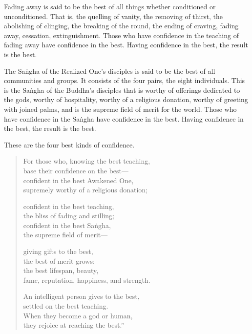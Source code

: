 \documentclass[12pt,openany]{book}%
\begin{document}
Fading away is said to be the best of all things whether conditioned or unconditioned. That is, the quelling of vanity, the removing of thirst, the abolishing of clinging, the breaking of the round, the ending of craving, fading away, cessation, extinguishment. Those who have confidence in the teaching of fading away have confidence in the best. Having confidence in the best, the result is the best. 

The \textsanskrit{Saṅgha} of the Realized One’s disciples is said to be the best of all communities and groups. It consists of the four pairs, the eight individuals. This is the \textsanskrit{Saṅgha} of the Buddha’s disciples that is worthy of offerings dedicated to the gods, worthy of hospitality, worthy of a religious donation, worthy of greeting with joined palms, and is the supreme field of merit for the world. Those who have confidence in the \textsanskrit{Saṅgha} have confidence in the best. Having confidence in the best, the result is the best. 

These are the four best kinds of confidence. 

\begin{verse}%
For those who, knowing the best teaching, \\
base their confidence on the best—\\
confident in the best Awakened One, \\
supremely worthy of a religious donation; 

confident in the best teaching, \\
the bliss of fading and stilling; \\
confident in the best \textsanskrit{Saṅgha}, \\
the supreme field of merit—

giving gifts to the best, \\
the best of merit grows: \\
the best lifespan, beauty, \\
fame, reputation, happiness, and strength. 

An intelligent person gives to the best, \\
settled on the best teaching. \\
When they become a god or human, \\
they rejoice at reaching the best.” 

%
\end{verse}
\end{document}

